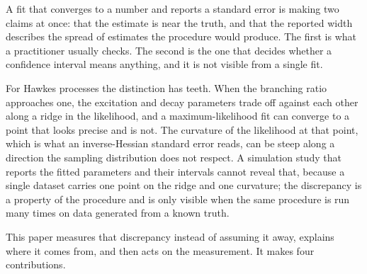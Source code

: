 A fit that converges to a number and reports a standard error is making two claims
at once: that the estimate is near the truth, and that the reported width describes
the spread of estimates the procedure would produce. The first is what a
practitioner usually checks. The second is the one that decides whether a
confidence interval means anything, and it is not visible from a single fit.

For Hawkes processes the distinction has teeth. When the branching ratio approaches
one, the excitation and decay parameters trade off against each other along a ridge
in the likelihood, and a maximum-likelihood fit can converge to a point that looks
precise and is not. The curvature of the likelihood at that point, which is what an
inverse-Hessian standard error reads, can be steep along a direction the sampling
distribution does not respect. A simulation study that reports the fitted parameters
and their intervals cannot reveal that, because a single dataset carries one point
on the ridge and one curvature; the discrepancy is a property of the procedure and
is only visible when the same procedure is run many times on data generated from a
known truth.

This paper measures that discrepancy instead of assuming it away, explains where it
comes from, and then acts on the measurement. It makes four contributions.

